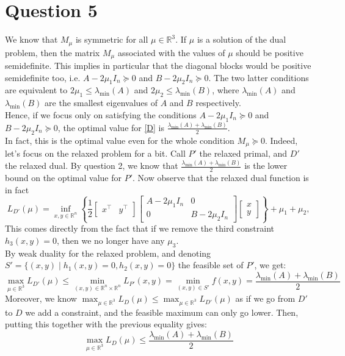 \documentclass{article}
\newcommand{\R}{\mathbb{R}}
\newcommand{\tp}{^\top}
\begin{document}
\section*{Question 5}
We know that $M_\mu$ is symmetric for all $\mu\in\R^3$. If $\mu$ is a solution of the dual problem, then the matrix $M_\mu$ associated with the values of $\mu$ should be positive semidefinite. This implies in particular that the diagonal blocks would be positive semidefinite too, i.e. $A-2\mu_1 I_n\succeq 0$ and $B-2\mu_2 I_n \succeq 0$. The two latter conditions are equivalent to $2\mu_1\leq \lambda_{\min} (A)$ and $2\mu_2\leq \lambda_{\min}(B)$, where  $\lambda_{\min} (A)$ and $\lambda_{\min} (B)$ are the smallest eigenvalues of $A$ and $B$ respectively.\\
Hence, if we focus only on satisfying the conditions  $A-2\mu_1 I_n\succeq 0$ and $B-2\mu_2 I_n \succeq 0$, the optimal value for \eqref{D} is $\frac{\lambda_{\min} (A)+\lambda_{\min} (B)}{2}$. \\
In fact, this is the optimal value even for the whole condition $M_\mu\succeq 0$. Indeed, let's focus on the relaxed problem for a bit. Call $P'$ the relaxed primal, and $D'$ the relaxed dual. By question 2, we know that $\frac{\lambda_{\min} (A)+\lambda_{\min} (B)}{2}$ is the lower bound on the optimal value for $P'$. Now observe that the relaxed  dual function is in fact $$L_{D'} (\mu)= \inf\limits_{x,y\in\R^n} \left\lbrace \dfrac{1}{2} \begin{bmatrix} x\tp & y\tp\end{bmatrix}\begin{bmatrix} A-2\mu_1 I_n & 0 \\
0 & B-2\mu_2 I_n \end{bmatrix}\begin{bmatrix} x \\ y \end{bmatrix} \right\rbrace+\mu_1+\mu_2, $$
This comes directly from the fact that if we remove the third constraint $h_3(x,y)=0$, then we no longer have any $\mu_3$. \\

By weak duality for the relaxed problem, and denoting $S'=\{(x,y)\mid h_1(x,y)=0, h_2(x,y)=0\}$ the feasible set of $P'$, we get:
$$\max_{\mu\in\R^3} L_{D'}(\mu)\leq \min_{(x,y)\in\R^n\times\R^n}L_{P'}(x,y) = \min_{(x,y)\in S'} f(x,y) = \dfrac{\lambda_{\min} (A)+\lambda_{\min} (B)}{2}$$
Moreover, we know $\max_{\mu\in\R^3} L_{D}(\mu)\leq \max_{\mu\in\R^3} L_{D'}(\mu)$ as if we go from $D'$ to $D$ we add a constraint, and the feasible maximum can only go lower. Then, putting this together with the previous equality gives:
$$\max_{\mu\in\R^3} L_{D}(\mu)\leq \dfrac{\lambda_{\min} (A)+\lambda_{\min} (B)}{2}$$
\end{document}
